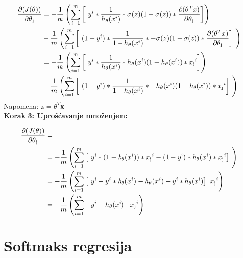 \documentclass[a4paper,12pt]{report}
\begin{document}
\begin{equation}
\begin{split}
	\frac{\partial (J(\theta))}{\partial \theta\textsubscript{j}} & = - \frac{1}{m} \left( \sum_{i=1}^{m} \left[\ y^i * \frac{1}{h\textsubscript {$\theta$} (x^i)} * \sigma(z)(1-\sigma(z))  * \frac{\partial (\theta^T x)}{\partial \theta\textsubscript{j}} \right] \right) \\ 
 		& - \frac{1}{m} \left( \sum_{i=1}^{m} \left[\ (1 - y^i) * \frac{1}{1 - h\textsubscript {$\theta$} (x^i)} * -\sigma(z)(1-\sigma(z))  * \frac{\partial (\theta^T x)}{\partial \theta\textsubscript{j}}\right]\ \right) \\
 		& = - \frac{1}{m} \left( \sum_{i=1}^{m} \left[\ y^i * \frac{1}{h\textsubscript {$\theta$} (x^i)} * {h\textsubscript {$\theta$} (x^i)}(1-{h\textsubscript {$\theta$} (x^i)})  * x\textsubscript{j}^i \right] \right) \\ 
 		& - \frac{1}{m} \left( \sum_{i=1}^{m} \left[\ (1 - y^i) * \frac{1}{1 - h\textsubscript {$\theta$} (x^i)} * -{h\textsubscript {$\theta$} (x^i)}(1-{h\textsubscript {$\theta$} (x^i)})  * x\textsubscript{j}^i\right]\ \right) \\
\end{split}
\end{equation}
Napomena: z = \textbf{$\theta^T$x} \\

\textbf{Korak 3: Uprošćavanje množenjem:} 

\begin{equation}
\begin{split}
	\frac{\partial (J(\theta))}{\partial \theta\textsubscript{j}} & = \\
	 & = - \frac{1}{m} \left( \sum_{i=1}^{m} \left[\ y^i * (1-{h\textsubscript {$\theta$} (x^i)})  * x\textsubscript{j}^i  - (1 - y^i)  * {h\textsubscript {$\theta$} (x^i)}  * x\textsubscript{j}^i\right]\ \right) \\
	  & = - \frac{1}{m} \left( \sum_{i=1}^{m} \left[\ y^i  - y^i * {h\textsubscript {$\theta$} (x^i)} - {h\textsubscript {$\theta$} (x^i)} + y^i  * {h\textsubscript {$\theta$} (x^i)} \right]\ x\textsubscript{j}^i  \right)  \\
	   & = - \frac{1}{m} \left( \sum_{i=1}^{m} \left[\ y^i  - {h\textsubscript {$\theta$} (x^i)} \right]\ x\textsubscript{j}^i  \right)  \\
\end{split}
\end{equation}

\section{Softmaks regresija}
\end{document}
